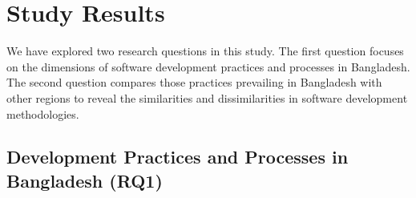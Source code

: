 \section{Study Results}
\label{study_results}


We have explored two research questions in this study. The first question focuses on the dimensions of software development practices and processes in Bangladesh. The second question compares those practices prevailing in Bangladesh with other regions to reveal the similarities and dissimilarities in software development methodologies.

\subsection{Development Practices and Processes in Bangladesh (RQ1)}
\label{RQ1}

